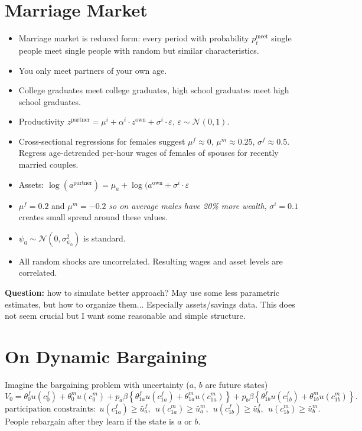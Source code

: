 \documentclass[12pt,letter]{article}
\begin{document}
\newpage
\section{Marriage Market}
\begin{itemize}
\item Marriage market is reduced form: every period with probability $p^{\text{meet}}_t$ single people meet single people with random but similar characteristics.
\item You only meet partners of your own age.
\item College graduates meet college graduates, high school graduates meet high school graduates.
\item Productivity $z^{\text{partner}} = \mu^i + \alpha^{i} \cdot z^{\text{own}} + \sigma^{i} \cdot \varepsilon$,  $\varepsilon \sim \mathcal{N}(0,1)$.
\item Cross-sectional regressions for females suggest $\mu^f\approx 0$, $\mu^m \approx 0.25$, $\sigma^f \approx 0.5$. Regress age-detrended per-hour wages of females of spouses for recently married couples. 
\item Assets: $\log(a^{\text{partner}}) = \mu_a + \log(a^{\text{own}} +  \sigma^{i} \cdot \varepsilon$
\item $\mu^f = 0.2$ and $\mu^m = -0.2$ \emph{so on average males have 20\% more wealth},  $\sigma^{i} = 0.1$ creates small spread around these values.
\item $\psi_0 \sim \mathcal{N}(0,\sigma^2_{\psi_0})$ is standard.
\item All random shocks are uncorrelated. Resulting wages and asset levels are correlated.
\end{itemize}

\textbf{Question:} how to simulate better approach? May use some less parametric estimates, but how to organize them... Especially assets/savings data. This does not seem crucial but I want some reasonable and simple structure.





\newpage


\section{On Dynamic Bargaining}
Imagine the bargaining problem with uncertainty ($a$, $b$ are future states)
\[V_0 = \theta^f_0u(c^f_0) + \theta^m_0 u(c^m_0) +  p_a \beta \left\{ \theta^f_{1a} u(c^f_{1a}) + \theta^m_{1a} u(c^m_{1a})\right\} +  p_b\beta \left\{ \theta^f_{1b} u(c^f_{1b}) + \theta^m_{1b} u(c^m_{1b})\right\}.\]
\[ \text{participation constraints:} \ \ u(c^f_{1a}) \geq \bar{u}^f_a, \ \ u(c^m_{1a}) \geq \bar{u}^m_a, \ \ u(c^f_{1b}) \geq \bar{u}^f_b, \ \ u(c^m_{1b}) \geq \bar{u}^m_b.\]
People rebargain after they learn if the state is $a$ or $b$.
\end{document}
